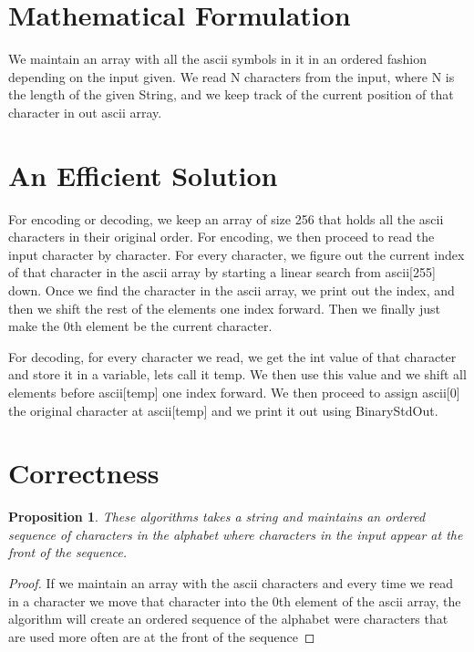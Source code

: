 \documentclass[12pt]{article}
\newtheorem{proposition}[theorem]{Proposition}
\begin{document}
 


\section{Mathematical Formulation}
We maintain an array with all the ascii symbols in it in an ordered fashion depending on the input given. We read N characters from the input, where N is the length of the given String, and we keep track of the current position of that character in out ascii array.

\section{An Efficient Solution}
For encoding or decoding, we keep an array of size 256 that holds all the ascii characters in their original order. For encoding, we then proceed to read the input character by character. For every character, we figure out the current index of that character in the ascii array by starting a linear search from ascii[255] down. Once we find the character in the ascii array, we print out the index, and then we shift the rest of the elements one index forward. Then we finally just make the 0th element be the current character.

For decoding, for every character we read, we get the int value of that character and store it in a variable, lets call it temp. We then use this value and we shift all elements before ascii[temp] one index forward. We then proceed to assign ascii[0] the original character at ascii[temp] and we print it out using BinaryStdOut.

\section{Correctness}

\begin{proposition}
These algorithms takes a string and maintains an ordered sequence of characters in the alphabet where characters in the input appear at the front of the sequence.
\end{proposition}

\begin{proof}
If we maintain an array with the ascii characters and every time we read in a character we move that character into the 0th element of the ascii array, the algorithm will create an ordered sequence of the alphabet were characters that are used more often are at the front of the sequence
\end{proof}
\end{document}
